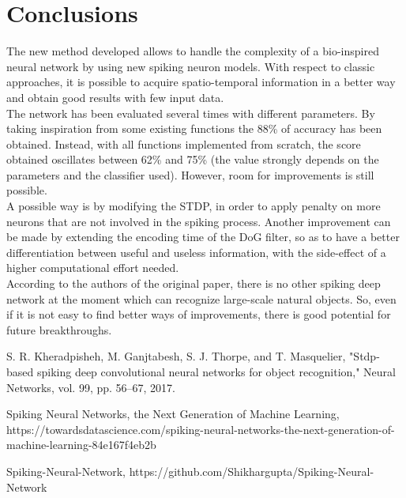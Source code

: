 \documentclass[11pt,a4paper]{scrartcl}
\begin{document}
\section{Conclusions}

The new method developed allows to handle the complexity of a bio-inspired neural network by using new spiking neuron models. With respect to classic approaches, it is possible to acquire spatio-temporal information in a better way and obtain good results with few input data.\\
The network has been evaluated several times with different parameters. By taking inspiration from some existing functions the 88\% of accuracy has been obtained. Instead, with all functions implemented from scratch, the score obtained oscillates between 62\% and 75\% (the value strongly depends on the parameters and the classifier used). However, room for improvements is still possible.\\
A possible way is by modifying the STDP, in order to apply penalty on more neurons that are not involved in the spiking process. Another improvement can be made by extending the encoding time of the DoG filter, so as to have a better differentiation between useful and useless information, with the side-effect of a higher computational effort needed.\\
According to the authors of the original paper, there is no other spiking deep network at the moment which can recognize large-scale natural objects. So, even if it is not easy to find better ways of improvements, there is good potential for future breakthroughs. 

\clearpage

\begin{thebibliography}{5}

S. R. Kheradpisheh, M. Ganjtabesh, S. J. Thorpe, and
T. Masquelier, "Stdp-based spiking deep convolutional neural
networks for object recognition," Neural Networks, vol. 99,
pp. 56–67, 2017.

Spiking Neural Networks, the Next Generation of Machine Learning, https://towardsdatascience.com/spiking-neural-networks-the-next-generation-of-machine-learning-84e167f4eb2b

Spiking-Neural-Network, https://github.com/Shikhargupta/Spiking-Neural-Network
\end{thebibliography}
\end{document}
